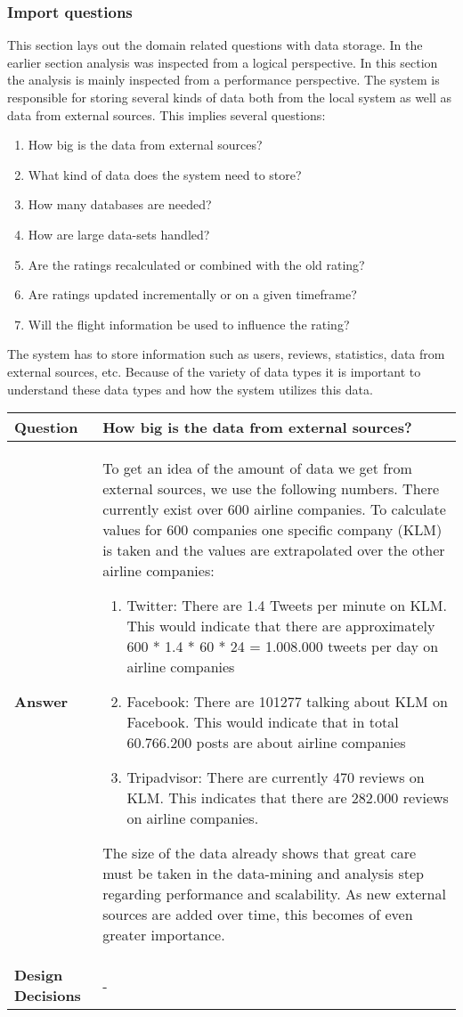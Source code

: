 \subsubsection{Import questions}
This section lays out the domain related questions with data storage. In the earlier section analysis was inspected from a logical perspective. In this section the analysis is mainly inspected from a performance perspective.
The system is responsible for storing several kinds of data both from the local system as well as data from external sources. This implies several questions:
\begin{enumerate}
\item How big is the data from external sources?
\item What kind of data does the system need to store?
\item How many databases are needed?
\item How are large data-sets handled?
\item Are the ratings recalculated or combined with the old rating?
\item Are ratings updated incrementally or on a given timeframe?
\item Will the flight information be used to influence the rating?
\end{enumerate}
The system has to store information such as users, reviews, statistics, data from external sources, etc. Because of the variety of data types it is important to understand these data types and how the system utilizes this data.

\begin{longtable}{| l |  p{12cm} |}
\hline
\textbf{Question} & \textbf{How big is the data from external sources?} \\ \hline
\textbf{Answer} &
	To get an idea of the amount of data we get from external sources, we use the following numbers. There currently exist over 600 airline companies. To calculate values for 600 companies one specific company (KLM) is taken and the values are extrapolated over the other airline companies:
\begin{enumerate}
\item Twitter: There are 1.4 Tweets per minute on KLM. This would indicate that there are approximately 600 * 1.4 * 60 * 24 = 1.008.000 tweets per day on airline companies
\item Facebook: There are 101277 talking about KLM on Facebook. This would indicate that in total 60.766.200 posts are about airline companies
\item Tripadvisor: There are currently 470 reviews on KLM. This indicates that there are 282.000 reviews on airline companies.
\end{enumerate}
The size of the data already shows that great care must be taken in the data-mining and analysis step regarding performance and scalability. As new external sources are added over time, this becomes of even greater importance. \\ \hline
\textbf{Design Decisions} & - \\ \hline
\end{longtable}

